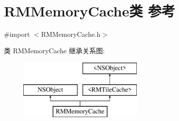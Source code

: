 \hypertarget{interface_r_m_memory_cache}{\section{R\-M\-Memory\-Cache类 参考}
\label{interface_r_m_memory_cache}
}


{\ttfamily \#import $<$R\-M\-Memory\-Cache.\-h$>$}

类 R\-M\-Memory\-Cache 继承关系图\-:\begin{figure}[H]
\begin{center}
\leavevmode
\includegraphics[height=3.000000cm]{interface_r_m_memory_cache}
\end{center}
\end{figure}
